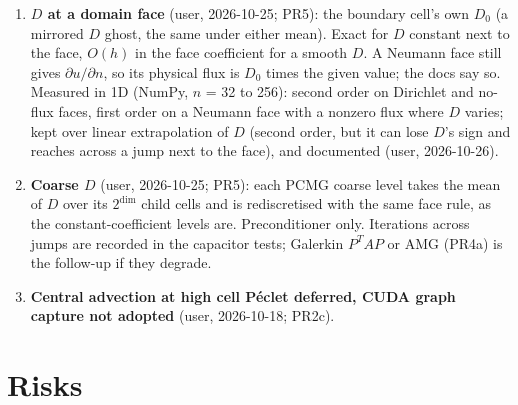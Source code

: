 \documentclass[11pt]{article}
\begin{document}
\begin{enumerate}[leftmargin=*]
$\nabla^2 u = 0$; Robin faces and the 5-point biharmonic with faces are errors.
The milestone review found that the ghost fill of $u$ alone imposes
$\partial^2u/\partial n^2 = 0$ and $\partial^3u/\partial n^3 = 0$ instead
when the face data vary along the face; the user approved (2026-10-26) setting
the ghosts of $w = \nabla^2 u$ to the exact reflection, which imposes the pairs
above (the homogeneous operator is unchanged), and (2026-10-26) imposing them
wherever the operator is used, explicit and postprocessing included.
\item \textbf{$D$ at a domain face} (user, 2026-10-25; PR5): the boundary
cell's own $D_0$ (a mirrored $D$ ghost, the same under either mean). Exact for
$D$ constant next to the face, $O(h)$ in the face coefficient for a smooth $D$.
A Neumann face still gives $\partial u/\partial n$, so its physical flux is
$D_0$ times the given value; the docs say so. Measured in 1D (NumPy, $n$ = 32 to
256): second order on Dirichlet and no-flux faces, first order on a Neumann face
with a nonzero flux where $D$ varies; kept over linear extrapolation of $D$ (second
order, but it can lose $D$'s sign and reaches across a jump next to the face), and
documented (user, 2026-10-26).
\item \textbf{Coarse $D$} (user, 2026-10-25; PR5): each PCMG coarse level
takes the mean of $D$ over its $2^{\mathrm{dim}}$ child cells and is
rediscretised with the same face rule, as the constant-coefficient levels are.
Preconditioner only. Iterations across jumps are recorded in the capacitor
tests; Galerkin $P^TAP$ or AMG (PR4a) is the follow-up if they degrade.
\item \textbf{Central advection at high cell P\'eclet deferred, CUDA graph
capture not adopted} (user, 2026-10-18; PR2c).
\end{enumerate}

\section{Risks}
\label{sec:risks}
\end{document}
